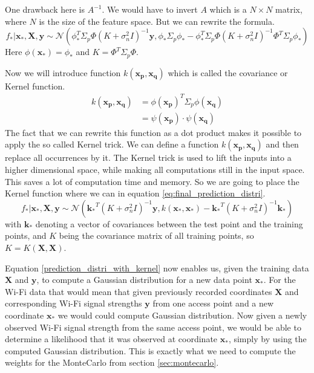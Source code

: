 One drawback here is $A^{-1}$. We would have to invert $A$ which is a $N\times N$ matrix, where $N$ is the size of the feature space. But we can rewrite the formula\citep[p. 12]{Rasmussen:2005:GPM:1162254}. 
\begin{equation}\label{eq:final_prediction_distri}
f_*|\mathbf{x_*},\mathbf{X}, \mathbf{y} \sim \mathcal{N}(\phi_*^T\Sigma_p\Phi(K+\sigma_n^2I)^{-1}\mathbf{y}, \phi_*\Sigma_p\phi_*-\phi_*^T\Sigma_p\Phi(K+\sigma_n^2I)^{-1}\Phi^T\Sigma_p\phi_*)
\end{equation}
Here $\phi(\mathbf{x_*}) = \phi_*$ and $K = \Phi^T\Sigma_p\Phi$.

Now we will introduce function $k(\mathbf{x_p}, \mathbf{x_q})$ which is called the covariance or \gls{Kernel} function. 
\begin{equation}\label{kernel}
\begin{aligned}
k(\mathbf{x_p}, \mathbf{x_q}) &= \phi(\mathbf{x_p})^T\Sigma_p\phi(\mathbf{x_q})\\
&= \psi(\mathbf{x_p}) \cdot \psi(\mathbf{x_q})
\end{aligned}
\end{equation}
The fact that we can rewrite this function as a dot product makes it possible to apply the so called \gls{Kernel} trick\citep[p. 12]{Rasmussen:2005:GPM:1162254}. We can define a function $k(\mathbf{x_p},\mathbf{x_q})$ and then replace all occurrences by it. The \gls{Kernel} trick is used to lift the inputs into a higher dimensional space, while making all computations still in the input space. This saves a lot of computation time and memory. So we are going to place the \gls{Kernel} function where we can in equation \ref{eq:final_prediction_distri}.
\begin{equation}\label{prediction_distri_with_kernel}
f_*|\mathbf{x_*},\mathbf{X}, \mathbf{y} \sim \mathcal{N}(\mathbf{k_*}^T(K+\sigma_n^2I)^{-1}\mathbf{y}, k(\mathbf{x_*},\mathbf{x_*})-\mathbf{k_*}^T(K+\sigma_n^2I)^{-1}\mathbf{k_*})
\end{equation}
with $\mathbf{k_*}$ denoting a vector of covariances between the test point and the training points, and $K$ being the covariance matrix of all training points, so $K = K(\mathbf{X}, \mathbf{X})$.

Equation \ref{prediction_distri_with_kernel} now enables us, given the training data $\mathbf{X}$ and $\mathbf{y}$, to compute a Gaussian distribution for a new data point $\mathbf{x_*}$. For the Wi-Fi data that would mean that given previously recorded coordinates $\mathbf{X}$ and corresponding Wi-Fi signal strengths $\mathbf{y}$ from one access point and a new coordinate $\mathbf{x_*}$ we would could compute Gaussian distribution. Now given a newly observed Wi-Fi signal strength from the same access point, we would be able to determine a likelihood that it was observed at coordinate $\mathbf{x_*}$, simply by using the computed Gaussian distribution. This is exactly what we need to compute the weights for the \Gls{MonteCarlo} from section \ref{sec:montecarlo}.

